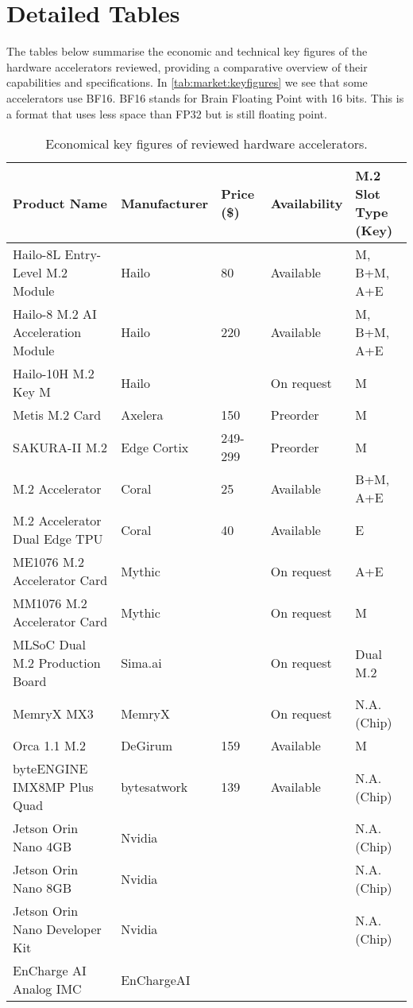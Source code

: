 \section{Detailed Tables}
The tables below summarise the economic and technical key figures of the hardware accelerators reviewed, providing a comparative overview of their capabilities and specifications.
In \cref{tab:market:keyfigures} we see that some accelerators use BF16.
BF16 stands for Brain Floating Point with 16 bits.
This is a format that uses less space than FP32 but is still floating point. 
\begin{table}[!ht]
    \centering
    \begin{tabular}{|l|l|l|l|l|}
    \hline
        Product Name & Manufacturer & Price (\$) & Availability & \makecell{M.2 Slot\\Type (Key)} \\ \hline
        Hailo-8L Entry-Level M.2 Module & Hailo & 80 & Available & M, B+M, A+E \\ \hline
        Hailo-8 M.2 AI Acceleration Module & Hailo & 220 & Available & M, B+M, A+E \\ \hline
        Hailo-10H M.2 Key M & Hailo & ~ & On request & M \\ \hline
        Metis M.2 Card & Axelera & 150 & Preorder & M \\ \hline
        SAKURA-II M.2 & Edge Cortix & 249-299 & Preorder & M \\ \hline
        M.2 Accelerator & Coral & 25 & Available & B+M, A+E \\ \hline
        M.2 Accelerator Dual Edge TPU & Coral & 40 & Available & E \\ \hline
        ME1076 M.2 Accelerator Card & Mythic & ~ & On request & A+E \\ \hline
        MM1076 M.2 Accelerator Card & Mythic & ~ & On request & M \\ \hline
        MLSoC Dual M.2 Production Board & Sima.ai & ~ & On request & Dual M.2 \\ \hline
        MemryX MX3 & MemryX & ~ & On request & N.A.(Chip) \\ \hline
        Orca 1.1 M.2 & DeGirum & 159 & Available & M \\ \hline
        byteENGINE IMX8MP Plus Quad & bytesatwork & 139 & Available & N.A.(Chip) \\ \hline
        Jetson Orin Nano 4GB & Nvidia & ~ & ~ & N.A.(Chip) \\ \hline
        Jetson Orin Nano 8GB & Nvidia & ~ & ~ & N.A.(Chip) \\ \hline
        Jetson Orin Nano Developer Kit & Nvidia & ~ & ~ & N.A.(Chip) \\ \hline
        EnCharge AI Analog IMC & EnChargeAI & ~ & ~ & ~ \\ \hline
    \end{tabular}
    \caption{Economical key figures of reviewed hardware accelerators.}
    \label{tab:market:ecotable}
\end{table}

